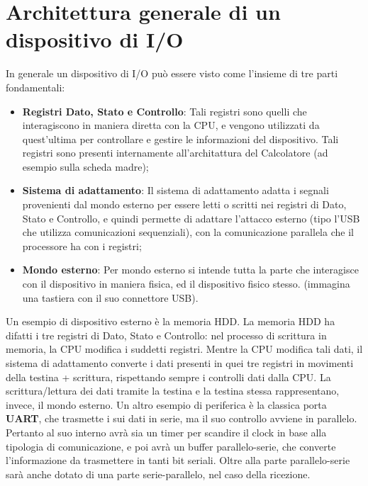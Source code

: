 \section{Architettura generale di un dispositivo di I/O}
In generale un dispositivo di I/O può essere visto come l'insieme di tre parti fondamentali:

\begin{itemize}

    \item \textbf{Registri Dato, Stato e Controllo}: Tali registri sono quelli che interagiscono in maniera diretta con la CPU, e vengono utilizzati da quest'ultima per controllare e gestire le informazioni del dispositivo. Tali registri sono presenti internamente all'architattura del Calcolatore (ad esempio sulla scheda madre);

    \item \textbf{Sistema di adattamento}: Il sistema di adattamento adatta i segnali provenienti dal mondo esterno per essere letti o scritti nei registri di Dato, Stato e Controllo, e quindi permette di adattare l'attacco esterno (tipo l'USB che utilizza comunicazioni sequenziali), con la comunicazione parallela che il processore ha con i registri;

    \item \textbf{Mondo esterno}: Per mondo esterno si intende tutta la parte che interagisce con il dispositivo in maniera fisica, ed il dispositivo fisico stesso. (immagina una tastiera con il suo connettore USB).

\end{itemize}

Un esempio di dispositivo esterno è la memoria HDD.
La memoria HDD ha difatti i tre registri di Dato, Stato e Controllo: nel processo di scrittura in memoria, la CPU modifica i suddetti registri. Mentre la CPU modifica tali dati, il sistema di adattamento converte i dati presenti in quei tre registri in movimenti della testina + scrittura, rispettando sempre i controlli dati dalla CPU. La scrittura/lettura dei dati tramite la testina e la testina stessa rappresentano, invece, il mondo esterno.
Un altro esempio di periferica è la classica porta \textbf{UART}, che trasmette i sui dati in serie, ma il suo controllo avviene in parallelo. Pertanto al suo interno avrà sia un timer per scandire il clock in base alla tipologia di comunicazione, e poi avrà un buffer parallelo-serie, che converte l'informazione da trasmettere in tanti bit seriali. Oltre alla parte parallelo-serie sarà anche dotato di una parte serie-parallelo, nel caso della ricezione.


